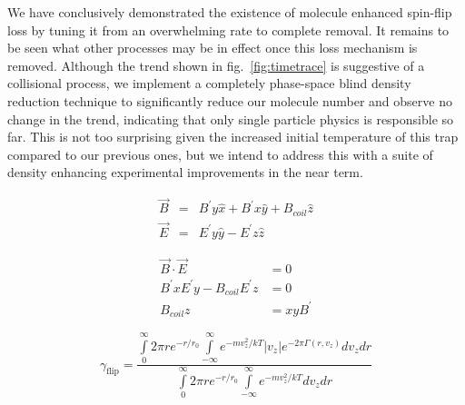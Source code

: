 \documentclass[%
 reprint,
 amsmath,amssymb,
 aps,
prl,
]{revtex4-1}
\begin{document}
We have conclusively demonstrated the existence of molecule enhanced spin-flip loss by tuning it from an overwhelming rate to complete removal. It remains to be seen what other processes may be in effect once this loss mechanism is removed. Although the trend shown in fig.~\ref{fig:timetrace} is suggestive of a collisional process, we implement a completely phase-space blind density reduction technique to significantly reduce our molecule number and observe no change in the trend, indicating that only single particle physics is responsible so far. This is not too surprising given the increased initial temperature of this trap compared to our previous ones, but we intend to address this with a suite of density enhancing experimental improvements in the near term.

\begin{eqnarray}
\vec{B} &=&  B^\prime y\hat{x}+ B^\prime x\hat{y} + B_{coil} \hat{z}\\
\vec{E} &=&  E^\prime y\hat{y}-  E^\prime z\hat{z}
\end{eqnarray}

\begin{eqnarray}
\vec{B}\cdot \vec{E} &= 0\\
B^\prime x E^\prime y - B_{coil}  E^\prime z &= 0\\
B_{coil}z &= xyB^\prime
\end{eqnarray}

\begin{equation}
\gamma_\text{flip}=\frac{\int\limits^\infty_0 2\pi r e^{-r/r_0} \int\limits^\infty_{-\infty} e^{-mv_z^2/kT} |v_z| e^{-2\pi\Gamma(r,v_z)}dv_zdr}{\int\limits^\infty_0 2\pi r e^{-r/r_0} \int\limits^\infty_{-\infty} e^{-mv_z^2/kT} dv_zdr}
\end{equation}

\nocite{*}


\end{document}
